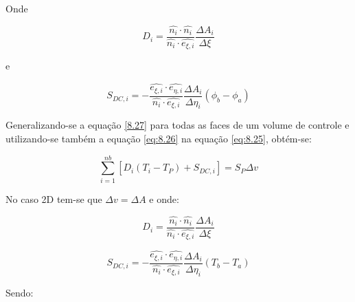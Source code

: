 Onde

\begin{equation}
    \label{eq:8.28}
    D_i = \frac{\hat{n_i} \cdot \hat{n_i}}{\hat{n_i} \cdot \hat{e_{\xi,i}}} \frac{\Delta A_i}{\Delta \xi}
\end{equation}

e

\begin{equation}
    \label{eq:8.29}
    S_{DC,i} = - \frac{\hat{e_{\xi,i}} \cdot \hat{e_{\eta,i}}}{\hat{n_i} \cdot \hat{e_{\xi,i}}} \frac{\Delta A_i}{\Delta \eta_i} (\phi_b - \phi_a)
\end{equation}

Generalizando-se a equação \ref{8.27} para todas as faces de um volume de controle e utilizando-se também a equação \ref{eq:8.26} na equação \ref{eq:8.25}, obtém-se:

\begin{equation}
    \label{eq:8.30}
    \sum_{i=1}^{nb} [ D_i (T_i - T_P) + S_{DC,i}] = S_P \Delta v
\end{equation}

No caso 2D tem-se que $\Delta v = \Delta A$ e onde:

\begin{equation}
    \label{eq:8.31}
    D_i = \frac{\hat{n_i} \cdot \hat{n_i}}{\hat{n_i} \cdot \hat{e_{\xi,i}}} \frac{\Delta A_i}{\Delta \xi}
\end{equation}

\begin{equation}
    \label{eq:8.32}
    S_{DC,i} = - \frac{\hat{e_{\xi,i}} \cdot \hat{e_{\eta,i}}}{\hat{n_i} \cdot \hat{e_{\xi,i}}} \frac{\Delta A_i}{\Delta \eta_i} (T_b - T_a)
\end{equation}

Sendo:

